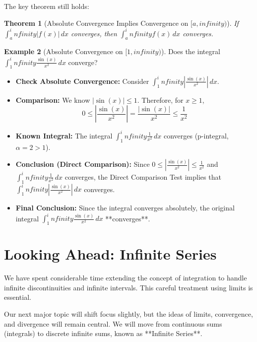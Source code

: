 \documentclass[11pt]{article}
\def\infty{infinity}%
\newtheorem{theorem}{Theorem}[section]
\theoremstyle{definition}
\newtheorem{example}[theorem]{Example}
\newcommand{\dx}{\, dx} %
\begin{document}
The key theorem still holds:

\begin{theorem}[Absolute Convergence Implies Convergence on $[a, \infty)$]
    If $\int_a^\infty |f(x)| \dx$ converges, then $\int_a^\infty f(x) \dx$ converges.
\end{theorem}

\begin{example}[Absolute Convergence on $[1, \infty)$] \label{ex:sin/x^2_infty}
    Does the integral $\int_1^\infty \frac{\sin(x)}{x^2} \dx$ converge?
    \begin{itemize}
        \item \textbf{Check Absolute Convergence:} Consider $\int_1^\infty \left| \frac{\sin(x)}{x^2} \right| \dx$.
        \item \textbf{Comparison:} We know $|\sin(x)| \le 1$. Therefore, for $x \ge 1$,
          \[ 0 \le \left| \frac{\sin(x)}{x^2} \right| = \frac{|\sin(x)|}{x^2} \le \frac{1}{x^2} \]
        \item \textbf{Known Integral:} The integral $\int_1^\infty \frac{1}{x^2} \dx$ converges (p-integral, $\alpha=2 > 1$).
        \item \textbf{Conclusion (Direct Comparison):} Since $0 \le \left| \frac{\sin(x)}{x^2} \right| \le \frac{1}{x^2}$ and $\int_1^\infty \frac{1}{x^2} \dx$ converges, the Direct Comparison Test implies that $\int_1^\infty \left| \frac{\sin(x)}{x^2} \right| \dx$ converges.
        \item \textbf{Final Conclusion:} Since the integral converges absolutely, the original integral $\int_1^\infty \frac{\sin(x)}{x^2} \dx$ **converges**.
    \end{itemize}
\end{example}

\section{Looking Ahead: Infinite Series}

We have spent considerable time extending the concept of integration to handle infinite discontinuities and infinite intervals. This careful treatment using limits is essential.

Our next major topic will shift focus slightly, but the ideas of limits, convergence, and divergence will remain central. We will move from continuous sums (integrals) to discrete infinite sums, known as **Infinite Series**.
\end{document}
